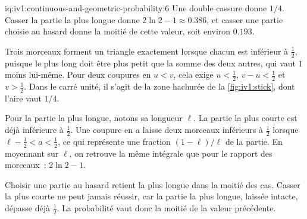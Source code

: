 \begin{solution}{iq:iv1:continuous-and-geometric-probability:6}
Une double cassure donne $1/4$. Casser la partie la plus longue donne $2\ln 2 - 1 \approx 0.386$, et casser une partie choisie au hasard donne la moitié de cette valeur, soit environ $0.193$.

Trois morceaux forment un triangle exactement lorsque chacun est inférieur à $\tfrac12$, puisque le plus long doit être plus petit que la somme des deux autres, qui vaut $1$ moins lui-même. Pour deux coupures en $u < v$, cela exige $u < \tfrac12$, $v - u < \tfrac12$ et $v > \tfrac12$. Dans le carré unité, il s'agit de la zone hachurée de la \cref{fig:iv1:stick}, dont l'aire vaut $1/4$.

Pour la partie la plus longue, notons sa longueur $\ell$. La partie la plus courte est déjà inférieure à $\tfrac12$. Une coupure en $a$ laisse deux morceaux inférieurs à $\tfrac12$ lorsque $\ell - \tfrac12 < a < \tfrac12$, ce qui représente une fraction $(1 - \ell)/\ell$ de la partie. En moyennant sur $\ell$, on retrouve la même intégrale que pour le rapport des morceaux~: $2\ln 2 - 1$.

Choisir une partie au hasard retient la plus longue dans la moitié des cas. Casser la plus courte ne peut jamais réussir, car la partie la plus longue, laissée intacte, dépasse déjà $\tfrac12$. La probabilité vaut donc la moitié de la valeur précédente.

\begin{omfigure}

\label{fig:iv1:stick}
\end{omfigure}

\end{solution}

